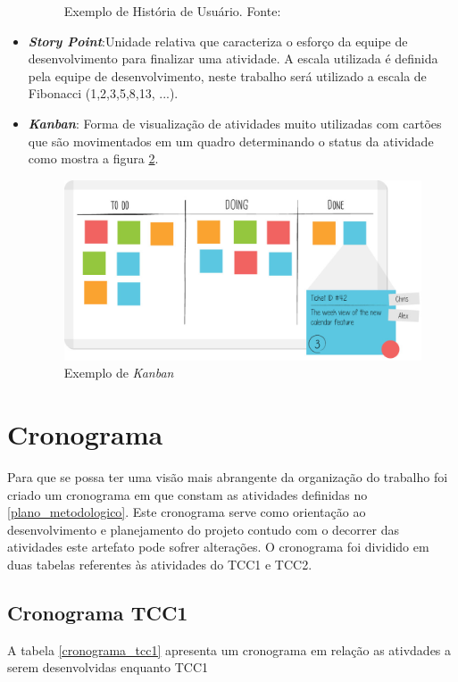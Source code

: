 \begin{itemize}
\begin{figure}[h]
\caption{Exemplo de História de Usuário. Fonte: \cite{sabbagh_scrum:_2014}}
\label{img:us}
\end{figure}
\item \textit{\textbf{Story Point}}:Unidade relativa que caracteriza o esforço da equipe de desenvolvimento para finalizar uma atividade. A escala utilizada é definida pela equipe de desenvolvimento, neste trabalho será utilizado a escala de Fibonacci (1,2,3,5,8,13, ...). 
\item \textit{\textbf{Kanban}}: Forma de visualização de atividades muito utilizadas com cartões que são movimentados em um quadro determinando o status da atividade como mostra a figura \ref{img:kanban}.
\graphicspath{{figuras/}}
\begin{figure}[h]
\centering
\includegraphics[scale=0.40]{kanban}
\caption{Exemplo de \textit{Kanban}}
\label{img:kanban}
\end{figure}

\end{itemize}
\section{Cronograma}
\label{cronograma}
Para que se possa ter uma visão mais abrangente da organização do trabalho foi criado um cronograma em que constam as atividades definidas no \ref{plano_metodologico}. Este cronograma serve como orientação ao desenvolvimento e planejamento do projeto contudo com o decorrer das atividades este artefato pode sofrer alterações. O cronograma foi dividido em duas tabelas referentes às atividades do TCC1 e TCC2.

\subsection{Cronograma TCC1}
A tabela \ref{cronograma_tcc1} apresenta um cronograma em relação as ativdades a serem desenvolvidas enquanto TCC1

